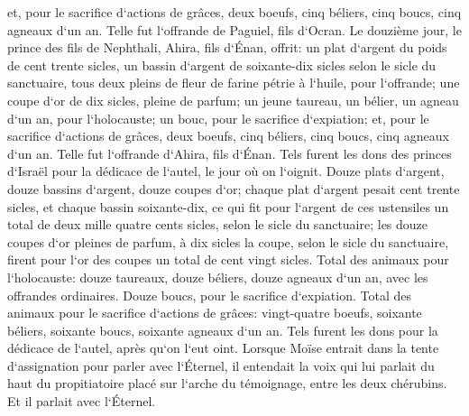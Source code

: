 \verse et, pour le sacrifice d`actions de grâces, deux boeufs, cinq béliers, cinq boucs, cinq agneaux d`un an. Telle fut l`offrande de Paguiel, fils d`Ocran. 
\verse Le douzième jour, le prince des fils de Nephthali, Ahira, fils d`Énan, 
\verse offrit: un plat d`argent du poids de cent trente sicles, un bassin d`argent de soixante-dix sicles selon le sicle du sanctuaire, tous deux pleins de fleur de farine pétrie à l`huile, pour l`offrande; 
\verse une coupe d`or de dix sicles, pleine de parfum; 
\verse un jeune taureau, un bélier, un agneau d`un an, pour l`holocauste; 
\verse un bouc, pour le sacrifice d`expiation; 
\verse et, pour le sacrifice d`actions de grâces, deux boeufs, cinq béliers, cinq boucs, cinq agneaux d`un an. Telle fut l`offrande d`Ahira, fils d`Énan. 
\verse Tels furent les dons des princes d`Israël pour la dédicace de l`autel, le jour où on l`oignit. Douze plats d`argent, douze bassins d`argent, douze coupes d`or; 
\verse chaque plat d`argent pesait cent trente sicles, et chaque bassin soixante-dix, ce qui fit pour l`argent de ces ustensiles un total de deux mille quatre cents sicles, selon le sicle du sanctuaire; 
\verse les douze coupes d`or pleines de parfum, à dix sicles la coupe, selon le sicle du sanctuaire, firent pour l`or des coupes un total de cent vingt sicles. 
\verse Total des animaux pour l`holocauste: douze taureaux, douze béliers, douze agneaux d`un an, avec les offrandes ordinaires. Douze boucs, pour le sacrifice d`expiation. 
\verse Total des animaux pour le sacrifice d`actions de grâces: vingt-quatre boeufs, soixante béliers, soixante boucs, soixante agneaux d`un an. Tels furent les dons pour la dédicace de l`autel, après qu`on l`eut oint. 
\verse Lorsque Moïse entrait dans la tente d`assignation pour parler avec l`Éternel, il entendait la voix qui lui parlait du haut du propitiatoire placé sur l`arche du témoignage, entre les deux chérubins. Et il parlait avec l`Éternel. 

